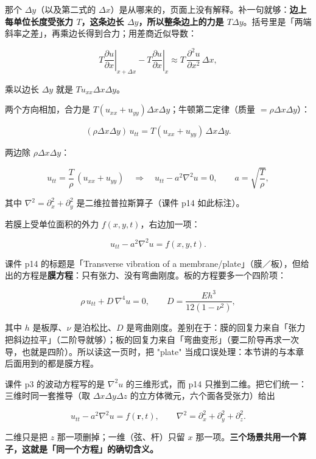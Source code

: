 \documentclass[11pt]{ctexart}
\let\origsubhdr\subhdr
\renewcommand{\subhdr}[1]{\par\needspace{3\baselineskip}\origsubhdr{#1}}
\begin{document}
那个 $\Delta y$（以及第二式的 $\Delta x$）是从哪来的，页面上没有解释。补一句就够：\textbf{边上每单位长度受张力 $T$，这条边长 $\Delta y$，所以整条边上的力是 $T\Delta y$}。括号里是「两端斜率之差」，再乘边长得到合力；用差商近似导数：

\[
T\left.\frac{\partial u}{\partial x}\right|_{x+\Delta x}-T\left.\frac{\partial u}{\partial x}\right|_{x}
\approx T\,\frac{\partial^2u}{\partial x^2}\,\Delta x ,
\]

乘以边长 $\Delta y$ 就是 $Tu_{xx}\Delta x\Delta y$。

两个方向相加，合力是 $T(u_{xx}+u_{yy})\Delta x\Delta y$；牛顿第二定律（质量 $=\rho\Delta x\Delta y$）：

\[
(\rho\Delta x\Delta y)\,u_{tt}=T(u_{xx}+u_{yy})\,\Delta x\Delta y .
\]

两边除 $\rho\Delta x\Delta y$：

\[
u_{tt}=\frac{T}{\rho}\,(u_{xx}+u_{yy})
\quad\Longrightarrow\quad
u_{tt}-a^2\nabla^2u=0,
\qquad a=\sqrt{\frac{T}{\rho}},
\]

其中 $\nabla^2=\partial_x^2+\partial_y^2$ 是二维拉普拉斯算子（课件 p14 如此标注）。


若膜上受单位面积的外力 $f(x,y,t)$，右边加一项：

\[
u_{tt}-a^2\nabla^2u=f(x,y,t).
\]


课件 p14 的标题是「Transverse vibration of a membrane/plate」（膜／板），但给出的方程是\textbf{膜方程}：只有张力、没有弯曲刚度。板的方程要多一个四阶项：

\[
\rho\,u_{tt}+D\,\nabla^4u=0,
\qquad D=\frac{E h^3}{12(1-\nu^2)},
\]

其中 $h$ 是板厚、$\nu$ 是泊松比、$D$ 是弯曲刚度。差别在于：膜的回复力来自「张力把斜边拉平」（二阶导就够）；板的回复力来自「弯曲变形」（要二阶导再求一次导，也就是四阶）。所以读这一页时，把 "plate" 当成口误处理：本节讲的与本章后面用到的都是膜方程。


课件 p3 的波动方程写的是 $\nabla^2u$ 的三维形式，而 p14 只推到二维。把它们统一：三维时同一套推导（取 $\Delta x\Delta y\Delta z$ 的立方体微元，六个面各受张力）给出

\[
u_{tt}-a^2\nabla^2u=f(\mathbf r,t),
\qquad
\nabla^2=\partial_x^2+\partial_y^2+\partial_z^2 .
\]

二维只是把 $z$ 那一项删掉；一维（弦、杆）只留 $x$ 那一项。\textbf{三个场景共用一个算子，这就是「同一个方程」的确切含义。}
\end{document}
